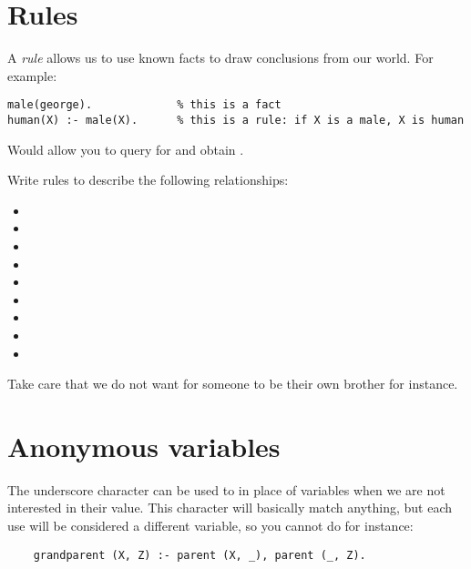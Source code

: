 \documentclass{../../../tp}
\begin{document}
\section{Rules}

A \emph{rule} allows us to use known facts to draw conclusions from our world. For example:

\begin{verbatim}
male(george).             % this is a fact
human(X) :- male(X).      % this is a rule: if X is a male, X is human
\end{verbatim}

Would allow you to query for  and obtain .


\begin{instruction}
	Write rules to describe the following relationships:
	\begin{itemize}
	 \item {}
	 \item {}
	 \item {}
	 \item {}
	 \item {}
	 \item {}
	 \item {}
	 \item {}
	 \item {}
	\end{itemize}
	
	Take care that we do not want for someone to be their own brother for instance.
\end{instruction}

\section{Anonymous variables}

The underscore character can be used to in place of variables when we are not interested in their value. This character will basically match anything, but each use will be considered a different variable, so you cannot do for instance:

\begin{verbatim}
	grandparent (X, Z) :- parent (X, _), parent (_, Z).
\end{verbatim}
\end{document}
